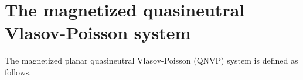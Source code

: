 \documentclass[%
 aip,
 amsmath,amssymb,
reprint, onecolumn %
]{revtex4-1}
\begin{document}

\section{The magnetized quasineutral Vlasov-Poisson system\label{sec:QNVP}}
The magnetized planar quasineutral Vlasov-Poisson (QNVP) system is defined as follows.
\end{document}
